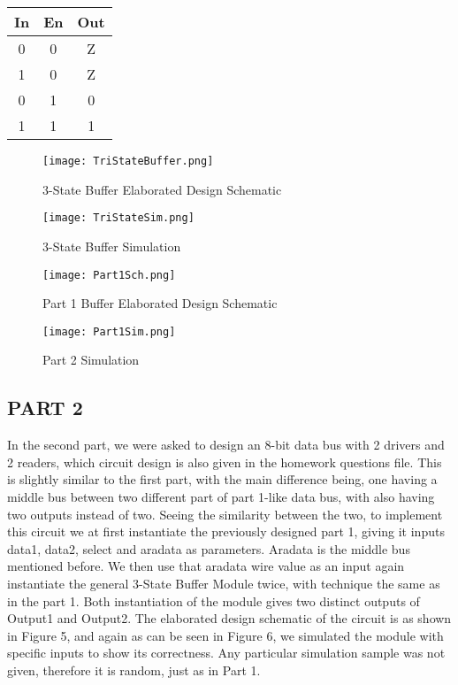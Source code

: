 \documentclass[pdftex,12pt,a4paper]{article}
\begin{document}
  \begin{center}
 \begin{tabular}{|c|c|c|} 
 \hline
 In & En & Out  \\ 
 \hline
 \hline 0 & 0 & Z \\ 
\hline
 \hline 1 & 0 & Z \\ 
\hline
 \hline 0 & 1 & 0 \\ 
\hline
 \hline 1 & 1 & 1 \\ 
\hline

 \hline
\end{tabular}
\end{center}



\begin{figure}[ht]
	\centering
	\texttt{[image: TriStateBuffer.png]}
	\caption{3-State Buffer Elaborated Design Schematic}
	\label{fig1}
\end{figure}


\begin{figure}[ht]
	\centering
	\texttt{[image: TriStateSim.png]}
	\caption{3-State Buffer Simulation}
	\label{fig1}
\end{figure}


\begin{figure}[ht]
	\centering
	\texttt{[image: Part1Sch.png]}
	\caption{Part 1 Buffer Elaborated Design Schematic}
	\label{fig1}
\end{figure}

\begin{figure}[ht]
	\centering
	\texttt{[image: Part1Sim.png]}
	\caption{Part 2 Simulation}
	\label{fig1}
\end{figure}

\subsection{PART 2}
In the second part, we were asked to design an 8-bit data bus with 2 drivers and 2 readers, which circuit design is also given in the homework questions file. This is slightly similar to the first part, with the main difference being, one having a middle bus between two different part of part 1-like data bus, with also having two outputs instead of two. Seeing the similarity between the two, to implement this circuit we at first instantiate the previously designed part 1, giving it inputs data1, data2, select and aradata as parameters. Aradata is the middle bus mentioned before. We then use that aradata wire value as an input again instantiate the general 3-State Buffer Module twice, with technique the same as in the part 1. Both instantiation of the module gives two distinct outputs of Output1 and Output2. The elaborated design schematic of the circuit is as shown in Figure 5, and again as can be seen in Figure 6, we simulated the module with specific inputs to show its correctness. Any particular simulation sample was not given, therefore it is random, just as in Part 1. 
\end{document}
